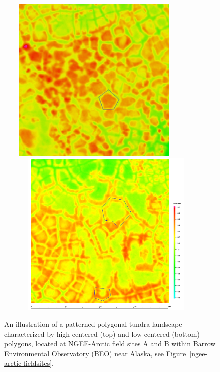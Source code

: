 \documentclass[review,11pt]{elsarticle}
\begin{document}
\begin{figure}[!h]
\centering
\includegraphics[width=9.5cm, height=8cm]{./figures/DEM_Area_B-HCP.png} \\
\hspace*{0.8cm}\includegraphics[width=10.8cm, height=8cm]{./figures/DEM_Area_A-LCP.png}
\caption{An illustration of a patterned polygonal tundra landscape characterized by high-centered (top) and low-centered (bottom) polygons, located at NGEE-Arctic field sites A and B within Barrow Environmental Observatory (BEO) near Alaska, see Figure~\ref{ngee-arctic-fieldsites}.}
\label{tundra-sitesA-B}
\end{figure}

\end{document}
